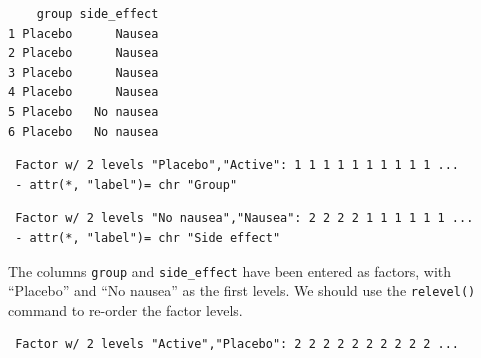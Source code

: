 \documentclass[
  a4paper,
]{memoir}
\newenvironment{Shaded}{\begin{snugshade}}{\end{snugshade}}
\newcommand{\AttributeTok}[1]{\textcolor[rgb]{0.00,0.00,0.00}{#1}}
\newcommand{\FunctionTok}[1]{\textcolor[rgb]{0.00,0.00,0.00}{#1}}
\newcommand{\NormalTok}[1]{\textcolor[rgb]{0.00,0.00,0.00}{#1}}
\newcommand{\OtherTok}[1]{\textcolor[rgb]{0.00,0.00,0.00}{#1}}
\newcommand{\SpecialCharTok}[1]{\textcolor[rgb]{0.00,0.00,0.00}{#1}}
\newcommand{\StringTok}[1]{\textcolor[rgb]{0.00,0.00,0.00}{#1}}
\begin{document}
\begin{verbatim}
    group side_effect
1 Placebo      Nausea
2 Placebo      Nausea
3 Placebo      Nausea
4 Placebo      Nausea
5 Placebo   No nausea
6 Placebo   No nausea
\end{verbatim}

\begin{Shaded}
\end{Shaded}

\begin{verbatim}
 Factor w/ 2 levels "Placebo","Active": 1 1 1 1 1 1 1 1 1 1 ...
 - attr(*, "label")= chr "Group"
\end{verbatim}

\begin{Shaded}
\end{Shaded}

\begin{verbatim}
 Factor w/ 2 levels "No nausea","Nausea": 2 2 2 2 1 1 1 1 1 1 ...
 - attr(*, "label")= chr "Side effect"
\end{verbatim}

The columns \texttt{group} and \texttt{side\_effect} have been entered
as factors, with ``Placebo'' and ``No nausea'' as the first levels. We
should use the \texttt{relevel()} command to re-order the factor levels.

\begin{Shaded}
\end{Shaded}

\begin{verbatim}
 Factor w/ 2 levels "Active","Placebo": 2 2 2 2 2 2 2 2 2 2 ...
\end{verbatim}
\end{document}
